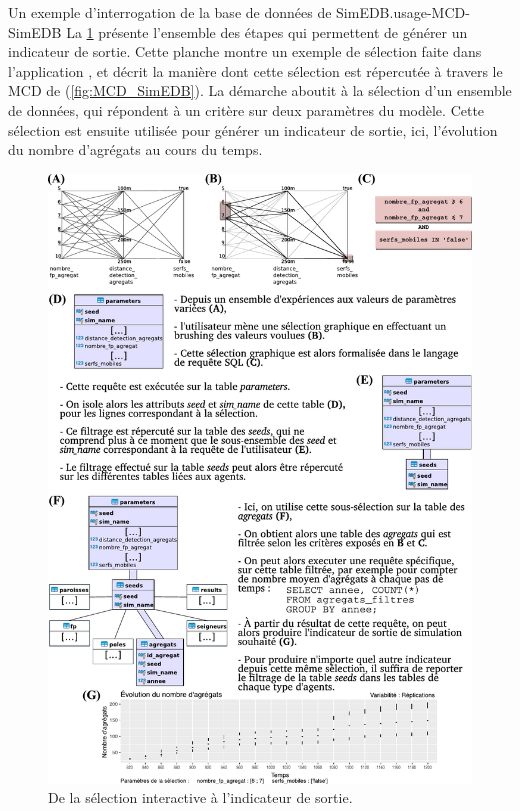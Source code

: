 \begin{encadre}{Un exemple d'interrogation de la base de données de SimEDB.}{usage-MCD-SimEDB}
	\renewcommand{\thempfootnote}{\alph{mpfootnote}}
	La \cref{fig:MCD_SimEDB_etapes} présente l'ensemble des étapes qui permettent de générer un indicateur de sortie.
	Cette planche montre un exemple de sélection faite dans l'application \simedb{}, et décrit la manière dont cette sélection est répercutée à travers le MCD de \simfeodal{} (\cref{fig:MCD_SimEDB}).
	La démarche aboutit à la sélection d'un ensemble de données, qui répondent à un critère sur deux paramètres du modèle.
	Cette sélection est ensuite utilisée pour générer un indicateur de sortie, ici, l'évolution du nombre d'agrégats au cours du temps.
	
	\begin{figure}[H]
		\centering
		\captionsetup{width=\linewidth}
		\includegraphics[width=.9\linewidth]{img/MCD_exemple_requetes_v2.pdf}
		\caption{De la sélection interactive à l'indicateur de sortie.}\vspace*{1em}
		\label{fig:MCD_SimEDB_etapes}
	\end{figure}
\end{encadre}

